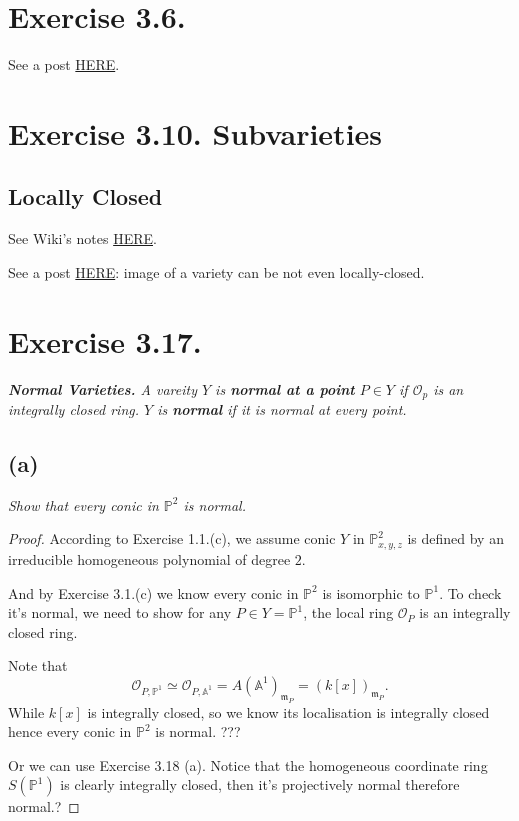 \section{Exercise 3.6.}

See a post \href{https://math.stackexchange.com/questions/2120717/there-are-quasi-affine-varieties-which-are-not-affine#:~:text=I%20see%20this%20sentence%20in,(0%2C0)%7D.}{HERE}.

\section{Exercise 3.10. \textbf{Subvarieties}}

\subsection{Locally Closed} 

See Wiki's notes \href{https://en.wikipedia.org/wiki/Locally_closed_subset}{HERE}. 

See a post \href{https://math.stackexchange.com/questions/341665/image-of-a-morphism-of-varieties}{HERE}: image of a variety can be not even locally-closed.

\section{Exercise 3.17.}
\textit{\textbf{Normal Varieties.} A vareity $Y$ is \textbf{normal at a point} $P\in Y$ if $\mathscr O_p$ is an integrally closed ring. $Y$ is \textbf{normal} if it is normal at every point.}

\subsection{(a)}\textit{Show that every conic in $\mathbb P^2$ is normal.}

\begin{proof}
According to Exercise 1.1.(c), we assume conic $Y$ in $\mathbb P^2_{x,y,z}$ is defined by an irreducible homogeneous polynomial of degree $2$. 

And by Exercise 3.1.(c) we know every conic in $\mathbb P^2$ is isomorphic to $\mathbb P^1$. To check it's normal, we need to show for any $P\in Y=\mathbb P^1$, the local ring $\mathscr O_P$ is an integrally closed ring. 

Note that
\[\mathscr O_{P,\mathbb P^1}\simeq \mathscr O_{P,\mathbb A^1}=A(\mathbb A^1)_{\mathfrak m_P}=(k[x])_{\mathfrak m_P}.\] While $k[x]$ is integrally closed, so we know its localisation is integrally closed hence every conic in $\mathbb P^2$ is normal. ???

Or we can use Exercise 3.18 (a). Notice that the homogeneous coordinate ring $S(\mathbb P^1)$ is clearly integrally closed, then it's projectively normal therefore normal.?

\end{proof}

